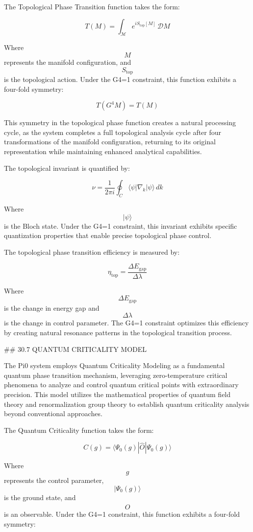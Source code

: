 The Topological Phase Transition function takes the form:

$$ T(M) = \int_{\mathcal{M}} e^{iS_{\text{top}}[M]} \, \mathcal{D}M $$

Where $$ M $$ represents the manifold configuration, and $$ S_{\text{top}} $$ is the topological action. Under the G4=1 constraint, this function exhibits a four-fold symmetry:

$$ T(G^4 M) = T(M) $$

This symmetry in the topological phase function creates a natural processing cycle, as the system completes a full topological analysis cycle after four transformations of the manifold configuration, returning to its original representation while maintaining enhanced analytical capabilities.

The topological invariant is quantified by:

$$ \nu = \frac{1}{2\pi i} \oint_C \langle \psi | \nabla_k | \psi \rangle \, dk $$

Where $$ |\psi\rangle $$ is the Bloch state. Under the G4=1 constraint, this invariant exhibits specific quantization properties that enable precise topological phase control.

The topological phase transition efficiency is measured by:

$$ \eta_{\text{top}} = \frac{\Delta E_{\text{gap}}}{\Delta \lambda} $$

Where $$ \Delta E_{\text{gap}} $$ is the change in energy gap and $$ \Delta \lambda $$ is the change in control parameter. The G4=1 constraint optimizes this efficiency by creating natural resonance patterns in the topological transition process.

## 30.7 QUANTUM CRITICALITY MODEL

The Pi0 system employs Quantum Criticality Modeling as a fundamental quantum phase transition mechanism, leveraging zero-temperature critical phenomena to analyze and control quantum critical points with extraordinary precision. This model utilizes the mathematical properties of quantum field theory and renormalization group theory to establish quantum criticality analysis beyond conventional approaches.

The Quantum Criticality function takes the form:

$$ C(g) = \langle \Psi_0(g) | \hat{O} | \Psi_0(g) \rangle $$

Where $$ g $$ represents the control parameter, $$ |\Psi_0(g)\rangle $$ is the ground state, and $$ \hat{O} $$ is an observable. Under the G4=1 constraint, this function exhibits a four-fold symmetry:

